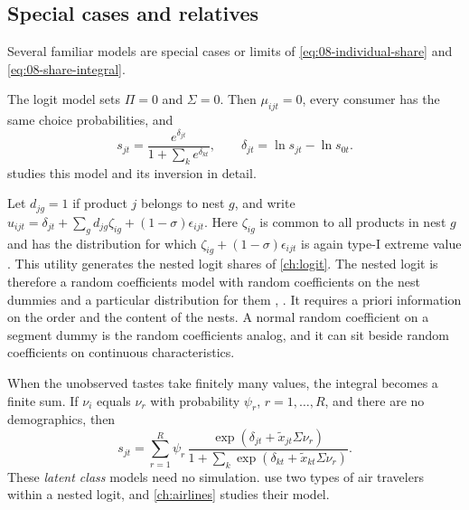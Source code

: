 \subsection{Special cases and relatives}\label{sec:08-special}

Several familiar models are special cases or limits of \eqref{eq:08-individual-share} and
\eqref{eq:08-share-integral}.

The logit model sets $\Pi = 0$ and $\Sigma = 0$. Then $\mu_{ijt} = 0$, every consumer has the same choice
probabilities, and \citep[eqs.~(6.3), (6.4)]{BerryLevinsohnPakes1995}
\begin{equation}\label{eq:08-logit-special}
  s_{jt} = \frac{e^{\delta_{jt}}}{1 + \sum_{k} e^{\delta_{kt}}}, \qquad
  \delta_{jt} = \ln s_{jt} - \ln s_{0t}.
\end{equation}
 studies this model and its inversion in detail.

\begin{remark}\label{rem:08-nested}
Let $d_{jg} = 1$ if product $j$ belongs to nest $g$, and write
$u_{ijt} = \delta_{jt} + \sum_g d_{jg}\zeta_{ig} + (1 - \sigma)\epsilon_{ijt}$. Here $\zeta_{ig}$ is common to
all products in nest $g$ and has the distribution for which $\zeta_{ig} + (1 - \sigma)\epsilon_{ijt}$ is again
type-I extreme value \citep{Cardell1997}. This utility generates the nested logit shares of \cref{ch:logit}.
The nested logit is therefore a random coefficients model with random coefficients on the nest dummies and a
particular distribution for them \citep[p.~851]{BerryLevinsohnPakes1995}, \citep[p.~524]{Nevo2000a}. It
requires a priori information on the order and the content of the nests. A normal random coefficient on a
segment dummy is the random coefficients analog, and it can sit beside random coefficients on continuous
characteristics.
\end{remark}

When the unobserved tastes take finitely many values, the integral becomes a finite sum. If $\nu_i$ equals
$\nu_r$ with probability $\psi_r$, $r = 1, \dots, R$, and there are no demographics, then
\begin{equation}\label{eq:08-finite-types}
  s_{jt} = \sum_{r=1}^{R} \psi_r\,
  \frac{\exp(\delta_{jt} + \tilde x_{jt}\Sigma\nu_r)}{1 + \sum_{k}\exp(\delta_{kt} + \tilde x_{kt}\Sigma\nu_r)}.
\end{equation}
These \emph{latent class} models need no simulation. \citet{BerryCarnallSpiller2006} use two types of air
travelers within a nested logit, and \cref{ch:airlines} studies their model.

